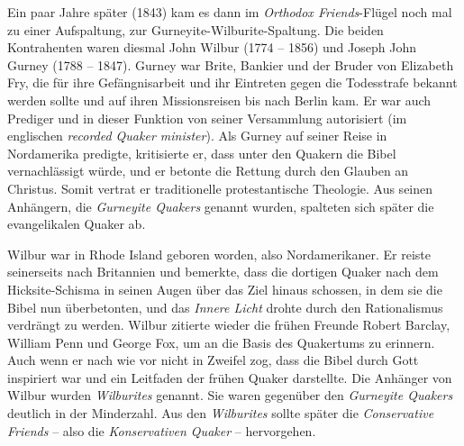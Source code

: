 Ein paar Jahre später (1843) kam es dann im \textit{Orthodox Friends}-Flügel
noch mal zu einer Aufspaltung, zur Gurneyite-Wilburite-Spaltung. Die beiden
Kontrahenten waren diesmal John Wilbur (1774 -- 1856) und Joseph John Gurney
(1788 -- 1847). Gurney war Brite, Bankier und der Bruder von Elizabeth Fry, die für
ihre Gefängnisarbeit und ihr Eintreten gegen
die Todesstrafe bekannt werden
sollte und auf ihren Missionsreisen bis nach Berlin kam.
Er war auch Prediger und in dieser Funktion
von seiner
Versammlung autorisiert (im englischen \textit{recorded Quaker minister}). Als
Gurney auf seiner Reise in Nordamerika predigte, kritisierte er, dass unter den
Quakern die Bibel vernachlässigt würde, und er betonte die
Rettung durch den Glauben an Christus. Somit vertrat er traditionelle
protestantische Theologie. Aus seinen
Anhängern, die \textit{Gurneyite Quakers}
genannt wurden, spalteten sich später die evangelikalen Quaker ab.

\medskip

Wilbur war in Rhode Island geboren worden, also
Nordamerikaner. Er reiste seinerseits
nach Britannien und bemerkte, dass die dortigen Quaker nach dem Hicksite-Schisma
in seinen Augen über das Ziel hinaus schossen, in dem sie die Bibel nun
überbetonten, und das \textit{Innere Licht} drohte durch den Rationalismus verdrängt
zu werden. Wilbur zitierte wieder die frühen Freunde Robert Barclay, William
Penn und George Fox, um an die Basis des Quakertums zu erinnern. Auch wenn er
nach wie vor nicht in Zweifel zog, dass die Bibel durch Gott inspiriert war und
ein Leitfaden der frühen Quaker darstellte. Die Anhänger von Wilbur wurden
\textit{Wilburites} genannt. Sie waren gegenüber den
\textit{Gurneyite Quakers} deutlich in der Minderzahl.
Aus den \textit{Wilburites} sollte später die
\textit{Conservative Friends} -- also die
\textit{Konservativen Quaker} --
hervorgehen.

\medskip

